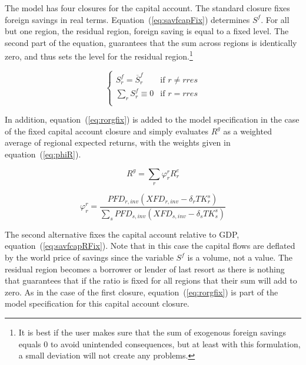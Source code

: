 \documentclass[11pt,letterpaper]{report}
\begin{document}
The model has four closures for the capital account. The standard closure fixes
foreign savings in real terms. Equation~(\ref{eq:savfcapFix}) determines $S^f$.
For all but one region, the residual region, foreign saving is equal to a fixed
level. The second part of the equation, guarantees that the sum across regions
is identically zero, and thus sets the level for the residual
region.\footnote{It is best if the user makes sure that the sum of exogenous
foreign savings equals 0 to avoid unintended consequences, but at least with
this formulation, a small deviation will not create any problems.}

\begin{equation}
\label{eq:savfcapFix}
\begin{cases}
   \displaystyle S^f_r=\overbar{S}^f_r
   & \textrm{if } r \ne \mathit{rres} \\
   \displaystyle \sum_r{S^f_r} \equiv 0
   & \textrm{if } r = \mathit{rres} \\
\end{cases}
\end{equation}

In addition, equation~(\ref{eq:rorgfix}) is added to the model specification in
the case of the fixed capital account closure and simply evaluates $R^g$ as a
weighted average of regional expected returns, with the weights given in
equation~(\ref{eq:phiR}).

\begin{equation}
\label{eq:rorgfix}
   R^g = \displaystyle\sum_r{\varphi^r_r R^e_r}
\end{equation}

\begin{equation}
\label{eq:phiR}
\varphi^r_r =
   \frac {\displaystyle \mathit{PFD}_{r,\mathit{inv}}
      \left(\mathit{XFD}_{r,\mathit{inv}} - \delta_r \mathit{TK}^s_r \right)}
         {\displaystyle \sum_s{ \mathit{PFD}_{s,\mathit{inv}}
            \left(\mathit{XFD}_{s,\mathit{inv}}
               - \delta_s \mathit{TK}^s_s \right)}}
\end{equation}

The second alternative fixes the capital account relative to GDP,
equation~(\ref{eq:savfcapRFix}). Note that in this case the
capital flows are deflated by the world price of savings since
the variable $S^f$ is a volume, not a value. The residual region
becomes a borrower or lender of last resort as there is nothing
that guarantees that if the ratio is fixed for all regions that
their sum will add to zero. As in the case of the first closure,
equation~(\ref{eq:rorgfix}) is part of the model specification
for this capital account closure.
\end{document}
